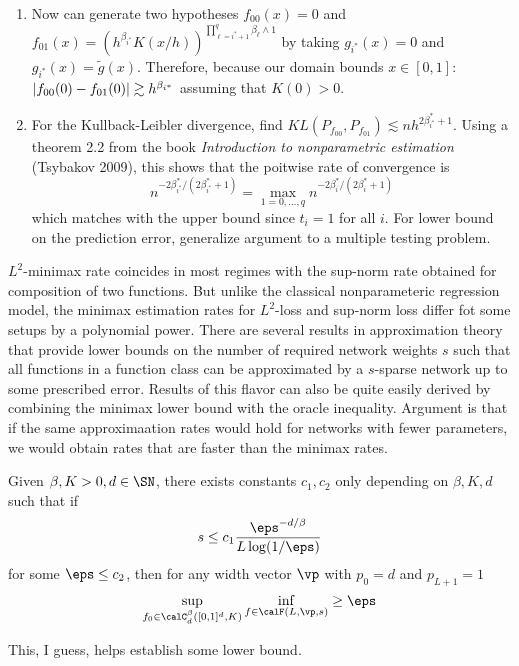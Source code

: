 \begin{enumerate}
	\item  Now can generate two hypotheses $f_{00}(x)=0$ and $f_{01}(x) = (h^{\beta_{i^*}}K(x/h))^{\prod_{\ell = i^* + 1}^q \beta_\ell \wedge 1}$ by taking $g_{i^*}(x) = 0$ and $g_{i^*}(x) = \tilde{g}(x)$. Therefore, because our domain bounds $x \in [0,1]$: $\vert f_{00}(0) - f_{01}(0)\vert\hbox{}\gtrsim h^{\beta_{i^*}}$ assuming that $K(0) > 0$. 
	\item For the Kullback-Leibler divergence, find $KL(P_{f_{00}}, P_{f_{01}}) \lesssim nh^{2\beta_{i^*}^* + 1}$. Using a theorem 2.2 from the book \textit{Introduction to nonparametric estimation} (Tsybakov 2009), this shows that the poitwise rate of convergence is 
	\[n^{-2\beta_{i^*}^*/(2\beta_{i^*}^* + 1)} = \max_{1 = 0,\dots, q} n^{-2\beta_i^*/(2\beta_i^* +1)}\]
	which matches with the upper bound since $t_i = 1$ for all $i$. For lower bound on the prediction error, generalize argument to a multiple testing problem.
\end{enumerate}
$L^2$-minimax rate coincides in most regimes with the sup-norm rate obtained for composition of two functions. But unlike the classical nonparameteric regression model, the minimax estimation rates for $L^2$-loss and sup-norm loss differ fot some setups by a polynomial power. There are several results in approximation theory that provide lower bounds on the number of required network weights $s$ such that all functions in a function class can be approximated by a $s$-sparse network up to some prescribed error. Results of this flavor can also be quite easily derived by combining the minimax lower bound with the oracle inequality. Argument is that if the same approximaation rates would hold for networks with fewer parameters, we would obtain rates that are faster than the minimax rates.
\begin{lemma}
	\label{lemma:sh-1}
	Given $\beta, K > 0, d\in\SN$, there exists constants $c_1, c_2$ only depending on $\beta, K, d$ such that if 
	\[s\leq c_1 \frac{\eps^{-d/\beta}}{L\log(1/\eps)}\]
	for some $\eps \leq c_2$, then for any width vector $\vp$ with $p_0 = d$ and $p_{L+1} = 1$
	\[\sup_{f_0\in \calC_d^\beta([0,1]^d, K)} \inf_{f\in\calF(L,\vp,s)} \geq \eps\]
\end{lemma}
This, I guess, helps establish some lower bound. 

